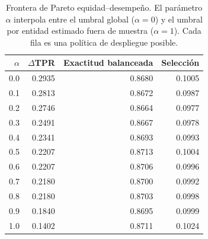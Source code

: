 
\begin{table}[htbp]
\centering
\caption{Frontera de Pareto equidad--desempeño. El parámetro $\alpha$ interpola
entre el umbral global ($\alpha=0$) y el umbral por entidad estimado fuera de
muestra ($\alpha=1$). Cada fila es una política de despliegue posible.}
\label{tab:pareto}
\begin{tabular}{r r r r}
\toprule
$\alpha$ & $\Delta$TPR & Exactitud balanceada & Selección \\
\midrule
0.0 & 0.2935 & 0.8680 & 0.1005 \\
0.1 & 0.2813 & 0.8672 & 0.0987 \\
0.2 & 0.2746 & 0.8664 & 0.0977 \\
0.3 & 0.2491 & 0.8667 & 0.0978 \\
0.4 & 0.2341 & 0.8693 & 0.0993 \\
0.5 & 0.2207 & 0.8713 & 0.1004 \\
0.6 & 0.2207 & 0.8706 & 0.0996 \\
0.7 & 0.2180 & 0.8700 & 0.0992 \\
0.8 & 0.2180 & 0.8703 & 0.0998 \\
0.9 & 0.1840 & 0.8695 & 0.0999 \\
1.0 & 0.1402 & 0.8711 & 0.1024 \\
\bottomrule
\end{tabular}
\end{table}
